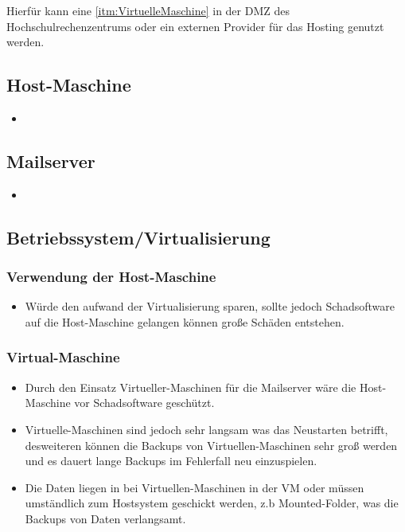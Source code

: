 \documentclass[a4paper,11pt,singlespacing]{article}
\begin{document}
		Hierfür kann eine \autoref{itm:VirtuelleMaschine} in der DMZ des Hochschulrechenzentrums oder ein externen Provider für das Hosting genutzt werden.
		

   \subsection{Host-Maschine}\label{sec:Host-Maschine}
				   \begin{itemize}
				   \item

				   \end{itemize}

  \subsection{Mailserver}\label{sec:Mailserver}
				   \begin{itemize}
				   \item

				  \end{itemize}

	\subsection{Betriebssystem/Virtualisierung}\label{sec:Betriebssystem/Virtualisierung}
		\subsubsection{Verwendung der Host-Maschine}\label{Verwendung der Host-Maschine}
			\begin{itemize}
			\item
				Würde den aufwand der Virtualisierung sparen, sollte jedoch Schadsoftware auf die Host-Maschine gelangen können große Schäden entstehen.
			\end{itemize}
		\subsubsection{Virtual-Maschine}\label{Virtual-Maschine}
			\begin{itemize}
			\item
				Durch den Einsatz Virtueller-Maschinen für die Mailserver wäre die Host-Maschine vor Schadsoftware geschützt.
			\item
				Virtuelle-Maschinen sind jedoch sehr langsam was das Neustarten betrifft, desweiteren können die Backups von Virtuellen-Maschinen sehr groß werden und es dauert lange Backups im Fehlerfall neu einzuspielen.
			\item
				Die Daten liegen in bei Virtuellen-Maschinen in der VM oder müssen umständlich zum Hostsystem geschickt werden, z.b Mounted-Folder, was die Backups von Daten verlangsamt.
			\end{itemize}
\end{document}
